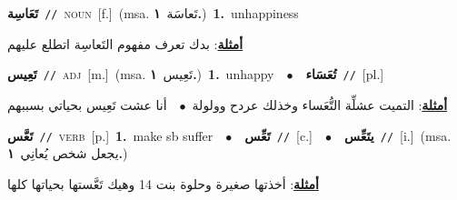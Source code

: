 \documentclass[10pt,a4paper,twoside]{article} %
\begin{document}
\begin{multicols}{2}
{\setlength\topsep{0pt}\textbf{\foreignlanguage{arabic}{تَعَاسِة}}\ {\color{gray}\texttt{//}\color{black}}\ \textsc{noun}\ [f.]\ \color{gray}(msa. \foreignlanguage{arabic}{تَعاسَة}~\foreignlanguage{arabic}{\textbf{١.}})\color{black}\ \textbf{1.}~unhappiness\  \begin{flushright}\color{gray}\foreignlanguage{arabic}{\textbf{\underline{\foreignlanguage{arabic}{أمثلة}}}: بدك تعرف مفهوم التَعاسِة اتطلع عليهم}\end{flushright}\color{black}} \vspace{2mm}

{\setlength\topsep{0pt}\textbf{\foreignlanguage{arabic}{تَعِيس}}\ {\color{gray}\texttt{//}\color{black}}\ \textsc{adj}\ [m.]\ \color{gray}(msa. \foreignlanguage{arabic}{تَعِيس}~\foreignlanguage{arabic}{\textbf{١.}})\color{black}\ \textbf{1.}~unhappy\ \ $\bullet$\ \ \setlength\topsep{0pt}\textbf{\foreignlanguage{arabic}{تُعَسَاء}}\ {\color{gray}\texttt{//}\color{black}}\ [pl.]\  \begin{flushright}\color{gray}\foreignlanguage{arabic}{\textbf{\underline{\foreignlanguage{arabic}{أمثلة}}}: التميت عشلِّة التُّعَساء وخذلك عردح وولولة\ $\bullet$\ \  أنا عشت تَعِيس بحياتي بسببهم}\end{flushright}\color{black}} \vspace{2mm}

{\setlength\topsep{0pt}\textbf{\foreignlanguage{arabic}{تَعَّس}}\ {\color{gray}\texttt{//}\color{black}}\ \textsc{verb}\ [p.]\ \textbf{1.}~make sb suffer\ \ $\bullet$\ \ \setlength\topsep{0pt}\textbf{\foreignlanguage{arabic}{تَعِّس}}\ {\color{gray}\texttt{//}\color{black}}\ [c.]\ \ $\bullet$\ \ \setlength\topsep{0pt}\textbf{\foreignlanguage{arabic}{يتَعِّس}}\ {\color{gray}\texttt{//}\color{black}}\ [i.]\ \color{gray}(msa. \foreignlanguage{arabic}{يجعل شخص يُعانِي}~\foreignlanguage{arabic}{\textbf{١.}})\color{black}\  \begin{flushright}\color{gray}\foreignlanguage{arabic}{\textbf{\underline{\foreignlanguage{arabic}{أمثلة}}}: أخذتها صغيرة وحلوة بنت 14 وهيك تَعَّستها بحياتها كلها}\end{flushright}\color{black}} \vspace{2mm}


\end{multicols}
\end{document}
